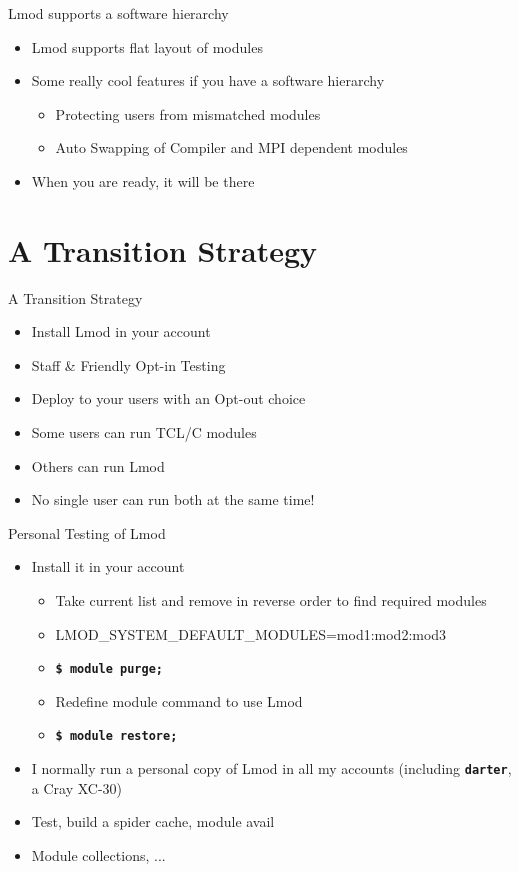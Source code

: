 \documentclass{beamer}
\begin{document}
\begin{frame}{Lmod supports a software hierarchy}
  \begin{itemize}
    \item Lmod supports flat layout of modules
    \item Some really cool features if you have a software hierarchy
      \begin{itemize}
        \item Protecting users from mismatched modules
        \item Auto Swapping of Compiler and MPI dependent modules
      \end{itemize}
    \item When you are ready, it will be there
  \end{itemize}
\end{frame}

\section{A Transition Strategy}

\begin{frame}{A Transition Strategy}
  \begin{itemize}
    \item Install Lmod in your account
    \item Staff \& Friendly Opt-in Testing
    \item Deploy to your users with an Opt-out choice
    \item Some users can run TCL/C modules
    \item Others can run Lmod
    \item No single user can run both at the same time!
  \end{itemize}
\end{frame}

\begin{frame}{Personal Testing of Lmod}
  \begin{itemize}
    \item Install it in your account
      \begin{itemize}
        \item Take current list and remove in reverse order to find
          required modules
        \item LMOD\_SYSTEM\_DEFAULT\_MODULES=mod1:mod2:mod3
        \item \texttt{\bf \$ module purge;}
        \item Redefine module command to use Lmod
        \item \texttt{\bf \$ module restore;}
      \end{itemize}
    \item I normally run a personal copy of Lmod in all my accounts
      (including \texttt{\bf darter}, a Cray XC-30)
    \item Test, build a spider cache, module avail
    \item Module collections, ...
  \end{itemize}
\end{frame}
\end{document}
